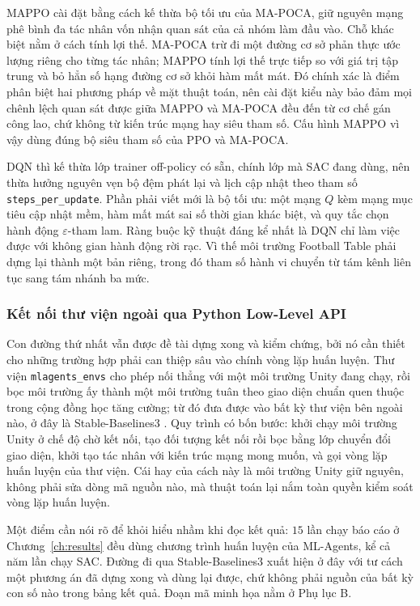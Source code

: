 \indent MAPPO cài đặt bằng cách kế thừa bộ tối ưu của MA-POCA, giữ nguyên mạng phê bình đa
tác nhân vốn nhận quan sát của cả nhóm làm đầu vào. Chỗ khác biệt nằm ở cách tính lợi thế.
MA-POCA trừ đi một đường cơ sở phản thực ước lượng riêng cho từng tác nhân; MAPPO tính lợi
thế trực tiếp so với giá trị tập trung và bỏ hẳn số hạng đường cơ sở khỏi hàm mất mát. Đó
chính xác là điểm phân biệt hai phương pháp về mặt thuật toán, nên cài đặt kiểu này bảo
đảm mọi chênh lệch quan sát được giữa MAPPO và MA-POCA đều đến từ cơ chế gán công lao, chứ
không từ kiến trúc mạng hay siêu tham số. Cấu hình MAPPO vì vậy dùng đúng bộ siêu tham số
của PPO và MA-POCA.

\indent DQN thì kế thừa lớp trainer off-policy có sẵn, chính lớp mà SAC đang dùng, nên thừa
hưởng nguyên vẹn bộ đệm phát lại và lịch cập nhật theo tham số
\texttt{steps\_per\_update}. Phần phải viết mới là bộ tối ưu: một mạng $Q$ kèm mạng mục
tiêu cập nhật mềm, hàm mất mát sai số thời gian khác biệt, và quy tắc chọn hành động
$\varepsilon$-tham lam. Ràng buộc kỹ thuật đáng kể nhất là DQN chỉ làm việc được với không
gian hành động rời rạc. Vì thế môi trường Football Table phải dựng lại thành một bản
riêng, trong đó tham số hành vi chuyển từ tám kênh liên tục sang tám nhánh ba mức.

\subsubsection{Kết nối thư viện ngoài qua Python Low-Level API}
\indent Con đường thứ nhất vẫn được đề tài dựng xong và kiểm chứng, bởi nó cần thiết cho
những trường hợp phải can thiệp sâu vào chính vòng lặp huấn luyện. Thư viện
\texttt{mlagents\_envs} cho phép nối thẳng với một môi trường Unity đang chạy, rồi bọc môi
trường ấy thành một môi trường tuân theo giao diện chuẩn quen thuộc trong cộng đồng học
tăng cường; từ đó đưa được vào bất kỳ thư viện bên ngoài nào, ở đây là Stable-Baselines3
\cite{raffin2021stable}. Quy trình có bốn bước: khởi chạy môi trường Unity ở chế độ chờ
kết nối, tạo đối tượng kết nối rồi bọc bằng lớp chuyển đổi giao diện, khởi tạo tác nhân
với kiến trúc mạng mong muốn, và gọi vòng lặp huấn luyện của thư viện. Cái hay của cách
này là môi trường Unity giữ nguyên, không phải sửa dòng mã nguồn nào, mà thuật toán lại
nắm toàn quyền kiểm soát vòng lặp huấn luyện.

\indent Một điểm cần nói rõ để khỏi hiểu nhầm khi đọc kết quả: $15$ lần chạy báo cáo ở
Chương~\ref{ch:results} đều dùng chương trình huấn luyện của ML-Agents, kể cả năm lần chạy
SAC. Đường đi qua Stable-Baselines3 xuất hiện ở đây với tư cách một phương án đã dựng xong
và dùng lại được, chứ không phải nguồn của bất kỳ con số nào trong bảng kết quả. Đoạn mã
minh họa nằm ở Phụ lục B.

